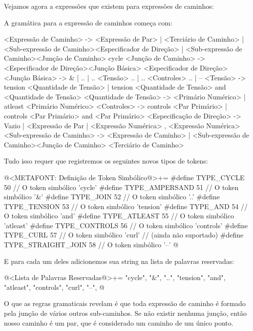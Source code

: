 Vejamos agora a expressões que existem para expressões de caminhos:


A gramática para a expressão de caminhos começa com:

\alinhaverbatim
<Expressão de Caminho> -> <Expressão de Par> | <Terciário de Caminho> |
                          <Sub-expressão de Caminho><Especificador de Direção> |
                          <Sub-expressão de Caminho><Junção de Caminho> cycle
<Junção de Caminho> -> <Especificador de Direção><Junção Básica>
                       <Especificador de Direção>
<Junção Básica> -> & | .. | .. <Tensão> .. | .. <Controles> .. | --
<Tensão> -> tension <Quantidade de Tensão> |
            tension <Quantidade de Tensão> and <Quantidade de Tensão>
<Quantidade de Tensão> -> <Primário Numérico> | atleast <Primário Numérico>
<Controles> -> controls <Par Primário> |
               controls <Par Primário> and <Par Primário>
<Especificação de Direção> -> Vazio |
                              { <Expressão de Par } |
                              { <Expressão Numérica> , <Expressão Numérica> }
<Sub-expressão de Caminho> -> <Expressão de Caminho> |
                              <Sub-expressão de Caminho><Junção de Caminho>
                              <Terciário de Caminho>
\alinhanormal

Tudo isso requer que registremos os seguintes novos tipos de tokens:

\iniciocodigo
@<METAFONT: Definição de Token Simbólico@>+=
#define TYPE_CYCLE          50 // O token simbólico 'cycle'
#define TYPE_AMPERSAND      51 // O token simbólico '&'
#define TYPE_JOIN           52 // O token simbólico '..'
#define TYPE_TENSION        53 // O token simbólico 'tension'
#define TYPE_AND            54 // O token simbólico 'and'
#define TYPE_ATLEAST        55 // O token simbólico 'atleast'
#define TYPE_CONTROLS       56 // O token simbólico 'controls'
#define TYPE_CURL           57 // O token simbólico 'curl'
                               // (ainda não suportado)
#define TYPE_STRAIGHT_JOIN  58 // O token simbólico '--'
@
\fimcodigo

E para cada um deles adicionemos sua string na lista de palavras
reservadas:

\iniciocodigo
@<Lista de Palavras Reservadas@>+=
"cycle", "&", "..", "tension", "and", "atleast", "controls", "curl", "--",
@
\fimcodigo

O que as regras gramaticais revelam é que toda expressão de caminho é
formado pela junção de vários outros sub-caminhos. Se não existir
nenhuma junção, então nosso caminho é um par, que é considerado um
caminho de um único ponto.

